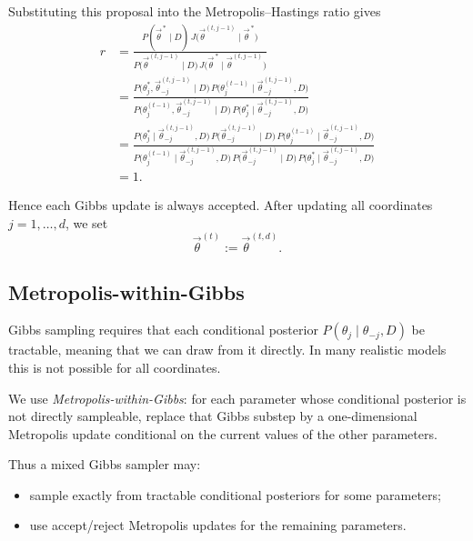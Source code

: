 \documentclass[11pt, titlepage]{article} %
\numberwithin{equation}{section}
\theoremstyle{definition}
\numberwithin{assumption}{section}
\begin{document}
Substituting this proposal into the Metropolis--Hastings ratio gives
\begin{align*}
r
&=
\frac{
P(\vec{\theta}^{\,*} \mid D)\,
J\bigl(\vec{\theta}^{(t,j-1)} \mid \vec{\theta}^{\,*}\bigr)
}{
P\bigl(\vec{\theta}^{(t,j-1)} \mid D\bigr)\,
J\bigl(\vec{\theta}^{\,*} \mid \vec{\theta}^{(t,j-1)}\bigr)
} \\
&=
\frac{
P\bigl(\theta_j^*,\vec{\theta}_{-j}^{(t,j-1)} \mid D\bigr)\,
P\bigl(\theta_j^{(t-1)} \mid \vec{\theta}_{-j}^{(t,j-1)}, D\bigr)
}{
P\bigl(\theta_j^{(t-1)},\vec{\theta}_{-j}^{(t,j-1)} \mid D\bigr)\,
P\bigl(\theta_j^* \mid \vec{\theta}_{-j}^{(t,j-1)}, D\bigr)
} \\
&=
\frac{
P\bigl(\theta_j^* \mid \vec{\theta}_{-j}^{(t,j-1)}, D\bigr)\,
P\bigl(\vec{\theta}_{-j}^{(t,j-1)} \mid D\bigr)\,
P\bigl(\theta_j^{(t-1)} \mid \vec{\theta}_{-j}^{(t,j-1)}, D\bigr)
}{
P\bigl(\theta_j^{(t-1)} \mid \vec{\theta}_{-j}^{(t,j-1)}, D\bigr)\,
P\bigl(\vec{\theta}_{-j}^{(t,j-1)} \mid D\bigr)\,
P\bigl(\theta_j^* \mid \vec{\theta}_{-j}^{(t,j-1)}, D\bigr)
} \\
&= 1.
\end{align*}

Hence each Gibbs update is always accepted. After updating all coordinates $j=1,\dots,d$, we set
\begin{equation*}
\vec{\theta}^{(t)}:=\vec{\theta}^{(t,d)}.
\end{equation*}


\subsection{Metropolis-within-Gibbs}

Gibbs sampling requires that each conditional posterior
$P(\theta_j\mid \theta_{-j},D)$
be tractable, meaning that we can draw from it directly. In many realistic models this is not possible for all coordinates.

We use \textit{Metropolis-within-Gibbs}: for each parameter whose conditional posterior is not directly sampleable, replace that Gibbs substep by a one-dimensional Metropolis update conditional on the current values of the other parameters.

Thus a mixed Gibbs sampler may:
\begin{itemize}
    \item sample exactly from tractable conditional posteriors for some parameters;
    \item use accept/reject Metropolis updates for the remaining parameters.
\end{itemize}
\end{document}
